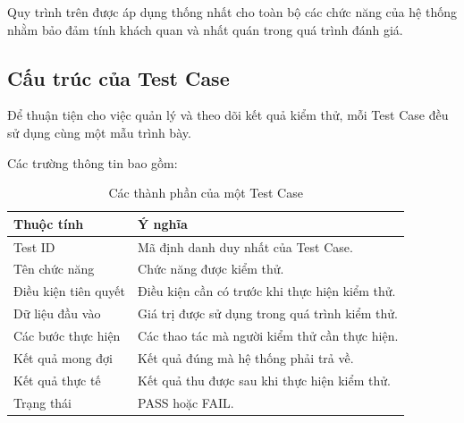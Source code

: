 Quy trình trên được áp dụng thống nhất cho toàn bộ các chức năng của hệ thống nhằm bảo đảm tính khách quan và nhất quán trong quá trình đánh giá.


\subsection{Cấu trúc của Test Case}

Để thuận tiện cho việc quản lý và theo dõi kết quả kiểm thử, mỗi Test Case đều sử dụng cùng một mẫu trình bày.

Các trường thông tin bao gồm:

\begin{table}[H]
	\centering
	\caption{Các thành phần của một Test Case}
	\label{tab:testcase-structure}
	\renewcommand{\arraystretch}{1.3}
	
	\begin{tabular}{|p{4cm}|p{9cm}|}
		
		\hline
		\textbf{Thuộc tính} & \textbf{Ý nghĩa} \\
		
		\hline
		Test ID & Mã định danh duy nhất của Test Case. \\
		
		\hline
		Tên chức năng & Chức năng được kiểm thử. \\
		
		\hline
		Điều kiện tiên quyết & Điều kiện cần có trước khi thực hiện kiểm thử. \\
		
		\hline
		Dữ liệu đầu vào & Giá trị được sử dụng trong quá trình kiểm thử. \\
		
		\hline
		Các bước thực hiện & Các thao tác mà người kiểm thử cần thực hiện. \\
		
		\hline
		Kết quả mong đợi & Kết quả đúng mà hệ thống phải trả về. \\
		
		\hline
		Kết quả thực tế & Kết quả thu được sau khi thực hiện kiểm thử. \\
		
		\hline
		Trạng thái & PASS hoặc FAIL. \\
		
		\hline
		
	\end{tabular}
\end{table}

